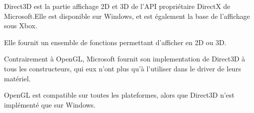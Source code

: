 
 Direct3D est la partie affichage 2D et 3D de l'API propriétaire DirectX de Microsoft.Elle est disponible sur Windows, et est également la base de l'affichage sous Xbox. 

Elle fournit un ensemble de fonctions permettant d'afficher en 2D ou 3D.
 
  Contrairement à OpenGL, Microsoft fournit son implementation de Direct3D à tous les constructeurs, qui eux n'ont plus qu'à l'utiliser dans le driver de leurs matériel.
  
  OpenGL est compatible sur toutes les plateformes, alors que Direct3D n'est implémenté que sur Windows.
  
  